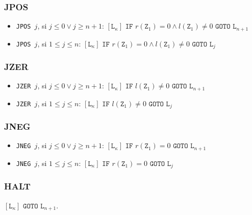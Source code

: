 \documentclass[twoside]{article}
\begin{document}
\subsubsection{JPOS}
\begin{itemize}
\item \texttt{JPOS }$j$, si $j\leq 0\lor j\geq n+1$:
$[\texttt{L}_\kappa]\texttt{ IF }r(\texttt{Z}_1)= 0\land l(\texttt{Z}_1)\neq 0\texttt{ GOTO }\texttt{L}_{n+1}$

\item \texttt{JPOS }$j$, si $1\leq j\leq n$:
$[\texttt{L}_\kappa]\texttt{ IF }r(\texttt{Z}_1)= 0\land l(\texttt{Z}_1)\neq 0\texttt{ GOTO }\texttt{L}_{j}$
\end{itemize}
\subsubsection{JZER}
\begin{itemize}
\item \texttt{JZER }$j$, si $j\leq 0\lor j\geq n+1$:
$[\texttt{L}_\kappa]\texttt{ IF } l(\texttt{Z}_1)\neq 0\texttt{ GOTO }\texttt{L}_{n+1}$

\item \texttt{JZER }$j$, si $1\leq j\leq n$:
$[\texttt{L}_\kappa]\texttt{ IF } l(\texttt{Z}_1)\neq 0\texttt{ GOTO }\texttt{L}_{j}$
\end{itemize}

\subsubsection{JNEG}
\begin{itemize}
\item \texttt{JNEG }$j$, si $j\leq 0\lor j\geq n+1$:
$[\texttt{L}_\kappa]\texttt{ IF } r(\texttt{Z}_1)= 0\texttt{ GOTO }\texttt{L}_{n+1}$

\item \texttt{JNEG }$j$, si $1\leq j\leq n$:
$[\texttt{L}_\kappa]\texttt{ IF } r(\texttt{Z}_1)= 0\texttt{ GOTO }\texttt{L}_{j}$
\end{itemize}

\subsubsection{HALT}
$[\texttt{L}_\kappa]\texttt{ GOTO }\texttt{L}_{n+1}$. 
\end{document}
